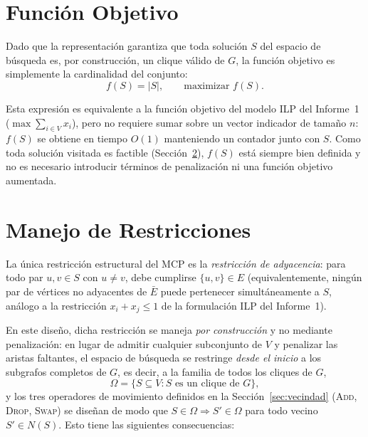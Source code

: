 \documentclass[letterpaper,12pt]{article}
\begin{document}
\section{Función Objetivo}\label{sec:objetivo}

Dado que la representación garantiza que toda solución $S$ del espacio de búsqueda es, por construcción, un clique válido de $G$, la función objetivo es simplemente la cardinalidad del conjunto:
\begin{equation}\label{eq:fobj}
    f(S) = |S|, \qquad \text{maximizar } f(S).
\end{equation}

Esta expresión es equivalente a la función objetivo del modelo ILP del Informe~1 ($\max \sum_{i\in V} x_i$), pero no requiere sumar sobre un vector indicador de tamaño $n$: $f(S)$ se obtiene en tiempo $O(1)$ manteniendo un contador junto con $S$. Como toda solución visitada es factible (Sección~\ref{sec:restricciones}), $f(S)$ está siempre bien definida y no es necesario introducir términos de penalización ni una función objetivo aumentada.

\section{Manejo de Restricciones}\label{sec:restricciones}

La única restricción estructural del MCP es la \emph{restricción de adyacencia}: para todo par $u,v \in S$ con $u \neq v$, debe cumplirse $\{u,v\} \in E$ (equivalentemente, ningún par de vértices no adyacentes de $\bar{E}$ puede pertenecer simultáneamente a $S$, análogo a la restricción $x_i+x_j\leq 1$ de la formulación ILP del Informe~1).

En este diseño, dicha restricción se maneja \emph{por construcción} y no mediante penalización: en lugar de admitir cualquier subconjunto de $V$ y penalizar las aristas faltantes, el espacio de búsqueda se restringe \emph{desde el inicio} a los subgrafos completos de $G$, es decir, a la familia de todos los cliques de $G$,
\[
\Omega = \{ S \subseteq V : S \text{ es un clique de } G \},
\]
y los tres operadores de movimiento definidos en la Sección~\ref{sec:vecindad} (\textsc{Add}, \textsc{Drop}, \textsc{Swap}) se diseñan de modo que $S \in \Omega \Rightarrow S' \in \Omega$ para todo vecino $S' \in N(S)$. Esto tiene las siguientes consecuencias:
\end{document}
